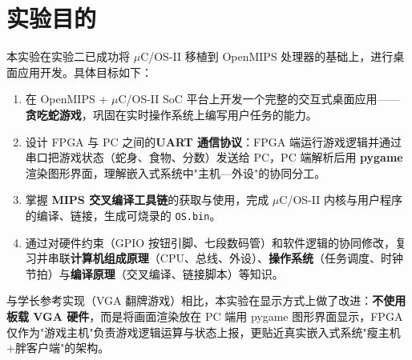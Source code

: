 \section{实验目的}

本实验在实验二已成功将 $\mu$C/OS-II 移植到 OpenMIPS 处理器的基础上，进行桌面应用开发。具体目标如下：

\begin{enumerate}[leftmargin=2em]
    \item 在 OpenMIPS + $\mu$C/OS-II SoC 平台上开发一个完整的交互式桌面应用——\textbf{贪吃蛇游戏}，巩固在实时操作系统上编写用户任务的能力。
    \item 设计 FPGA 与 PC 之间的\textbf{UART 通信协议}：FPGA 端运行游戏逻辑并通过串口把游戏状态（蛇身、食物、分数）发送给 PC，PC 端解析后用 \textbf{pygame} 渲染图形界面，理解嵌入式系统中"主机—外设"的协同分工。
    \item 掌握 \textbf{MIPS 交叉编译工具链}的获取与使用，完成 $\mu$C/OS-II 内核与用户程序的编译、链接，生成可烧录的 \texttt{OS.bin}。
    \item 通过对硬件约束（GPIO 按钮引脚、七段数码管）和软件逻辑的协同修改，复习并串联\textbf{计算机组成原理}（CPU、总线、外设）、\textbf{操作系统}（任务调度、时钟节拍）与\textbf{编译原理}（交叉编译、链接脚本）等知识。
\end{enumerate}

\noindent 与学长参考实现（VGA 翻牌游戏）相比，本实验在显示方式上做了改进：\textbf{不使用板载 VGA 硬件}，而是将画面渲染放在 PC 端用 pygame 图形界面显示，FPGA 仅作为"游戏主机"负责游戏逻辑运算与状态上报，更贴近真实嵌入式系统"瘦主机+胖客户端"的架构。
